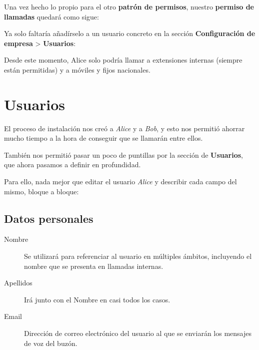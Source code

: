\documentclass[letterpaper,10pt,spanish]{sphinxmanual}
\begin{document}
Una vez hecho lo propio para el otro \textbf{patrón de permisos}, nuestro \textbf{permiso de llamadas} quedará como sigue:

\noindent{}

Ya solo faltaría añadírselo a un usuario concreto en la sección \textbf{Configuración de empresa} \textgreater{} \textbf{Usuarios}:

\noindent{}

Desde este momento, Alice solo podría llamar a extensiones internas (siempre están permitidas) y a móviles y fijos nacionales.


\section{Usuarios}
\label{pbx_features/users:usuarios}\label{pbx_features/users::doc}\label{pbx_features/users:users}
El proceso de instalación nos creó a \emph{Alice} y a \emph{Bob}, y esto nos permitió ahorrar mucho tiempo a la hora de conseguir que se llamarán entre ellos.

También nos permitió pasar un poco de puntillas por la sección de \textbf{Usuarios}, que ahora pasamos a definir en profundidad.

Para ello, nada mejor que editar el usuario \emph{Alice} y describir cada campo del mismo, bloque a bloque:


\subsection{Datos personales}
\label{pbx_features/users:datos-personales}
\noindent{}
\begin{description}
\item[{Nombre}] \leavevmode{}\label{pbx_features/users:term-nombre}
Se utilizará para referenciar al usuario en múltiples ámbitos, incluyendo el nombre que se presenta en llamadas internas.

\item[{Apellidos}] \leavevmode{}\label{pbx_features/users:term-apellidos}
Irá junto con el Nombre en casi todos los casos.

\item[{Email}] \leavevmode{}\label{pbx_features/users:term-email}
Dirección de correo electrónico del usuario al que se enviarán los mensajes de voz del buzón.

\end{description}
\end{document}
